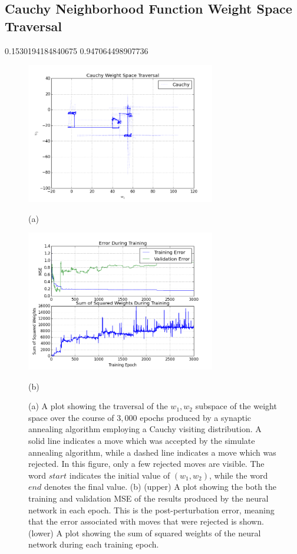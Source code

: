 \documentclass[11pt]{afthesis}
\begin{document}
	\subsection{Cauchy Neighborhood Function Weight Space Traversal} 
	0.1530194184840675 0.947064498907736

	 
  	\begin{figure}[ht!]
  		
  		\begin{minipage}[b]{0.5\linewidth}
  			\centering
  			\centerline{\includegraphics[width = 3.25in]{figures/weight_space_cauchy.png}}
 			\centerline{(a)}\medskip
  		\end{minipage}
  		\hfill
  		\begin{minipage}[b]{0.5\linewidth}
  			\centering
  			\centerline{\includegraphics[width = 3.25in]{figures/weight_space_cauchy_perf.png}}
  			\centerline{(b)}\medskip
  		\end{minipage}
  		\caption{
  			(a) A plot showing the traversal of the $w_1,w_2$ subspace of the weight space over the course of $3,000$ epochs produced by a synaptic annealing algorithm employing a Cauchy visiting distribution. A solid line indicates a move which was accepted by the simulate annealing algorithm, while a dashed line indicates a move which was rejected. In this figure, only a few rejected moves are visible. The word $start$ indicates the initial value of $(w_1,w_2)$, while the word $end$ denotes the final value. 
  			(b) (upper) A plot showing the both the training and validation MSE of the results produced by the neural network in each epoch. This is the post-perturbation error, meaning that the error associated with moves that were rejected is shown. (lower) A plot showing the sum of squared weights of the neural network during each training epoch.}
  		\label{fig:weight_space_cauchy}
  		

\end{figure}
\end{document}
